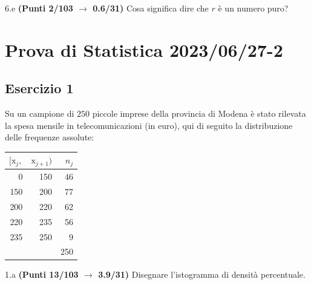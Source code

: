 \documentclass[
  11pt,
]{book}
\theoremstyle{mytheoremstyle}
\theoremstyle{mydefstyle}
\begin{document}
6.e \textbf{(Punti 2/103 \(\rightarrow\) 0.6/31)} Cosa significa dire che \(r\) è un numero puro?

\section{Prova di Statistica 2023/06/27-2}\label{prova-di-statistica-20230627-2}

\subsection{Esercizio 1}\label{esercizio-1-29}

Su un campione di \(250\) piccole imprese della provincia di Modena è stato rilevata la spesa mensile in telecomunicazioni (in euro), qui di seguito
la distribuzione delle frequenze assolute:

\begin{table}[H]
\centering
\begin{tabular}{rrr}
\toprule
$[\text{x}_j,$ & $\text{x}_{j+1})$ & $n_j$\\
\midrule
0 & 150 & 46\\
150 & 200 & 77\\
200 & 220 & 62\\
220 & 235 & 56\\
235 & 250 & 9\\
 &  & 250\\
\bottomrule
\end{tabular}
\end{table}

1.a \textbf{(Punti 13/103 \(\rightarrow\) 3.9/31)} Disegnare l'istogramma di densità percentuale.
\end{document}
